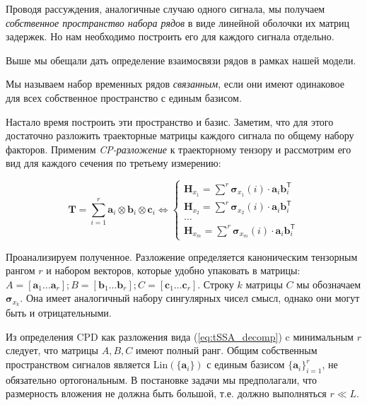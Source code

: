 	Проводя рассуждения, аналогичные случаю одного сигнала, мы получаем \emph{собственное пространство набора рядов} в виде линейной оболочки их матриц задержек. Но нам необходимо построить его для каждого сигнала отдельно.
	
	Выше мы обещали дать определение взаимосвязи рядов в рамках нашей модели. 
	
	\begin{Def}
		Мы называем набор временных рядов \emph{связанным}, если они имеют одинаковое для всех собственное пространство с единым базисом.
	\end{Def}
	
	Настало время построить эти пространство и базис. Заметим, что для этого достаточно разложить траекторные матрицы каждого сигнала по общему набору факторов. Применим \textit{CP-разложение} к траекторному тензору и рассмотрим его вид для каждого сечения по третьему измерению:
	
	\begin{equation}\label{eq:tSSA_decomp}
		\mathbf{T} = \sum\limits_{i = 1}^{r} \mathbf{a}_i \otimes \mathbf{b}_i \otimes \mathbf{c}_i \Leftrightarrow \begin{cases}
			\mathbf{H}_{x_1} = \sum\limits^{r} \boldsymbol{\sigma}_{x_1}(i) \cdot \mathbf{a}_i  \mathbf{b}_i^{\mathsf{T}}  \\
			\mathbf{H}_{x_2} = \sum\limits^{r} \boldsymbol{\sigma}_{x_2}(i) \cdot \mathbf{a}_i  \mathbf{b}_i^{\mathsf{T}} \\
			\ldots \\
			\mathbf{H}_{x_m} = \sum\limits^{r} \boldsymbol{\sigma}_{x_m}(i) \cdot \mathbf{a}_i  \mathbf{b}_i^{\mathsf{T}} 
		\end{cases}
	\end{equation}
	
	Проанализируем полученное. Разложение определяется каноническим тензорным рангом $ r $ и набором векторов, которые удобно упаковать в матрицы: $ A = [\mathbf{a}_1 \ldots \mathbf{a}_r]; B = [\mathbf{b}_1 \ldots \mathbf{b}_r]; C = [\mathbf{c}_1 \ldots \mathbf{c}_r] $. Строку $ k $ матрицы $ C $ мы обозначаем $ \boldsymbol{\sigma}_{x_k} $. Она имеет аналогичный набору сингулярных чисел смысл, однако они могут быть и отрицательными.
	
	Из определения CPD как разложения вида (\ref{eq:tSSA_decomp}) c минимальным $ r $ следует, что матрицы $ A, B, C $ имеют полный ранг. Общим собственным пространством сигналов является $ \text{Lin}(\{\mathbf{a}_i\}) $ с единым базисом $ \{\mathbf{a}_i\}_{i = 1}^r $, не обязательно ортогональным. В постановке задачи мы предполагали, что размерность вложения не должна быть большой, т.е. должно выполняться $ r \ll L $.
	
